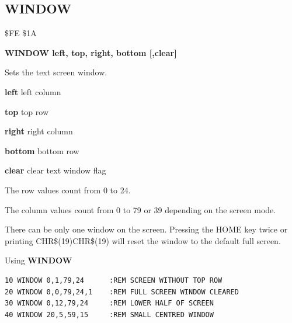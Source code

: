 \subsection{WINDOW}
\begin{description}[leftmargin=2cm,style=nextline]
\item [Token:] \$FE \$1A
\item [Format:] {\bf WINDOW left, top, right, bottom [,clear]}
\item [Usage:] Sets the text screen window.

                 {\bf left} left column

                 {\bf top} top row

                 {\bf right} right column

                 {\bf bottom} bottom row

                 {\bf clear} clear text window flag

                 The row values count from 0 to 24.

                 The column values count from 0 to 79 or 39
                 depending on the screen mode.

\item [Remarks:] There can be only one window on the screen.
                 Pressing the HOME key twice or printing
                 CHR\$(19)CHR\$(19) will reset the window
                 to the default full screen.

\item [Example:] Using {\bf WINDOW}
\begin{tcolorbox}[colback=black,coltext=white]
\verbatimfont{\codefont}
\begin{verbatim}
10 WINDOW 0,1,79,24      :REM SCREEN WITHOUT TOP ROW
20 WINDOW 0,0,79,24,1    :REM FULL SCREEN WINDOW CLEARED
30 WINDOW 0,12,79,24     :REM LOWER HALF OF SCREEN
40 WINDOW 20,5,59,15     :REM SMALL CENTRED WINDOW
\end{verbatim}
\end{tcolorbox}
\end{description}


\newpage
